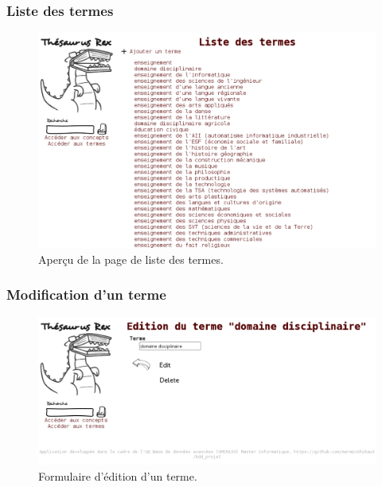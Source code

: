 \subsubsection{Liste des termes}
\begin{figure}[H]
\begin{center}
\includegraphics[width=\textwidth]{files/screen_termes}
\end{center}
\caption{Aperçu de la page de liste des termes.}
\end{figure}

\subsubsection{Modification d'un terme}
\begin{figure}[H]
\begin{center}
\includegraphics[width=\textwidth]{files/screen_terme_edit}
\end{center}
\caption{Formulaire d'édition d'un terme.}
\end{figure}